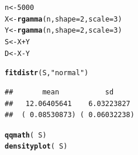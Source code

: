 \documentclass[twoside]{book}\usepackage[]{graphicx}\usepackage[]{xcolor}
\makeatletter
\newcommand{\hlnum}[1]{\textcolor[rgb]{0.686,0.059,0.569}{#1}}%
\newcommand{\hlstr}[1]{\textcolor[rgb]{0.192,0.494,0.8}{#1}}%
\newcommand{\hlopt}[1]{\textcolor[rgb]{0,0,0}{#1}}%
\newcommand{\hlstd}[1]{\textcolor[rgb]{0.345,0.345,0.345}{#1}}%
\newcommand{\hlkwb}[1]{\textcolor[rgb]{0.69,0.353,0.396}{#1}}%
\newcommand{\hlkwc}[1]{\textcolor[rgb]{0.333,0.667,0.333}{#1}}%
\newcommand{\hlkwd}[1]{\textcolor[rgb]{0.737,0.353,0.396}{\textbf{#1}}}%
\newenvironment{kframe}{%
 \def\at@end@of@kframe{}%
 \ifinner\ifhmode%
  \def\at@end@of@kframe{\end{minipage}}%
  \begin{minipage}{\columnwidth}%
 \fi\fi%
 \def\FrameCommand##1{\hskip\@totalleftmargin \hskip-\fboxsep
 \colorbox{shadecolor}{##1}\hskip-\fboxsep
     \hskip-\linewidth \hskip-\@totalleftmargin \hskip\columnwidth}%
 \MakeFramed {\advance\hsize-\width
   \@totalleftmargin\z@ \linewidth\hsize
   \@setminipage}}%
 {\par\unskip\endMakeFramed%
 \at@end@of@kframe}
\newenvironment{knitrout}{}{} %
\makeatother
\begin{document}
\begin{solution}
\begin{knitrout}
\color{fgcolor}\begin{kframe}
\begin{alltt}
\hlstd{n} \hlkwb{<-} \hlnum{5000}
\hlstd{X} \hlkwb{<-} \hlkwd{rgamma}\hlstd{(n,} \hlkwc{shape} \hlstd{=} \hlnum{2}\hlstd{,} \hlkwc{scale} \hlstd{=} \hlnum{3}\hlstd{)}
\hlstd{Y} \hlkwb{<-} \hlkwd{rgamma}\hlstd{(n,} \hlkwc{shape} \hlstd{=} \hlnum{2}\hlstd{,} \hlkwc{scale} \hlstd{=} \hlnum{3}\hlstd{)}
\hlstd{S} \hlkwb{<-} \hlstd{X} \hlopt{+} \hlstd{Y}
\hlstd{D} \hlkwb{<-} \hlstd{X} \hlopt{-} \hlstd{Y}
\end{alltt}
\end{kframe}
\end{knitrout}
\begin{knitrout}
\color{fgcolor}\begin{kframe}
\begin{alltt}
\hlkwd{fitdistr}\hlstd{(S,} \hlstr{"normal"}\hlstd{)}
\end{alltt}
\begin{verbatim}
##       mean           sd     
##   12.06405641    6.03223827 
##  ( 0.08530873) ( 0.06032238)
\end{verbatim}
\begin{alltt}
\hlkwd{qqmath}\hlstd{(}\hlopt{~}\hlstd{S)}
\hlkwd{densityplot}\hlstd{(}\hlopt{~}\hlstd{S)}
\end{alltt}
\end{kframe}


\end{knitrout}
\end{solution}
\end{document}
